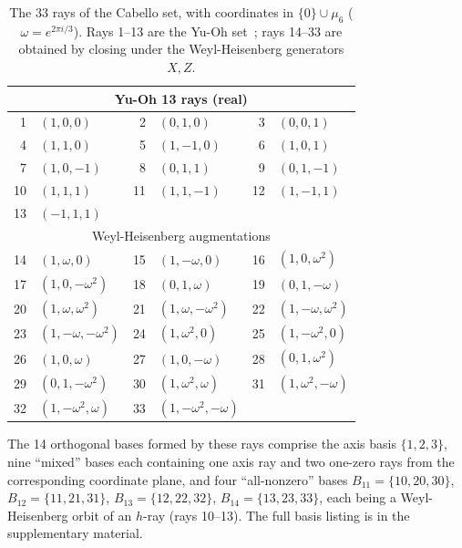 \documentclass[twocolumn,prl,superscriptaddress,nofootinbib]{revtex4-2}
\begin{document}
\begin{table}[t]
\centering
\caption{The 33 rays of the Cabello set, with coordinates in $\{0\} \cup \mu_6$ ($\omega = e^{2\pi i/3}$).  Rays 1--13 are the Yu-Oh set~\cite{YuOh2012}; rays 14--33 are obtained by closing under the Weyl-Heisenberg generators $X, Z$.\label{tab:cabello33}}
\small
\begin{tabular}{rl@{\quad}rl@{\quad}rl}
\toprule
\multicolumn{6}{c}{Yu-Oh 13 rays (real)}\\
\midrule
1 & $(1,0,0)$            & 2 & $(0,1,0)$            & 3 & $(0,0,1)$            \\
4 & $(1,1,0)$            & 5 & $(1,-1,0)$           & 6 & $(1,0,1)$            \\
7 & $(1,0,-1)$           & 8 & $(0,1,1)$            & 9 & $(0,1,-1)$           \\
10 & $(1,1,1)$           & 11 & $(1,1,-1)$          & 12 & $(1,-1,1)$          \\
13 & $(-1,1,1)$          &    &                      &    &                      \\
\midrule
\multicolumn{6}{c}{Weyl-Heisenberg augmentations}\\
\midrule
14 & $(1,\omega,0)$       & 15 & $(1,-\omega,0)$      & 16 & $(1,0,\omega^2)$    \\
17 & $(1,0,-\omega^2)$    & 18 & $(0,1,\omega)$       & 19 & $(0,1,-\omega)$     \\
20 & $(1,\omega,\omega^2)$ & 21 & $(1,\omega,-\omega^2)$ & 22 & $(1,-\omega,\omega^2)$ \\
23 & $(1,-\omega,-\omega^2)$ & 24 & $(1,\omega^2,0)$  & 25 & $(1,-\omega^2,0)$   \\
26 & $(1,0,\omega)$       & 27 & $(1,0,-\omega)$      & 28 & $(0,1,\omega^2)$    \\
29 & $(0,1,-\omega^2)$    & 30 & $(1,\omega^2,\omega)$ & 31 & $(1,\omega^2,-\omega)$ \\
32 & $(1,-\omega^2,\omega)$ & 33 & $(1,-\omega^2,-\omega)$ & & \\
\bottomrule
\end{tabular}
\end{table}

The 14 orthogonal bases formed by these rays comprise the axis basis $\{1,2,3\}$, nine ``mixed'' bases each containing one axis ray and two one-zero rays from the corresponding coordinate plane, and four ``all-nonzero'' bases $B_{11} = \{10,20,30\}$, $B_{12} = \{11,21,31\}$, $B_{13} = \{12,22,32\}$, $B_{14} = \{13,23,33\}$, each being a Weyl-Heisenberg orbit of an $h$-ray (rays 10--13).  The full basis listing is in the supplementary material.
\end{document}
